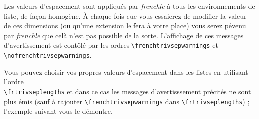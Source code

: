 \documentclass[a4paper,12pt,openright]{article}
\begin{document}
Les valeurs d’espacement sont appliqués par \textit{frenchle} à tous les environnements
de liste, de façon homogène. À chaque fois que vous essaierez de modifier
la valeur de ces dimensions (ou qu’une extension le fera à votre place) vous serez
pévenu par \textit{frenchle} que celà n’est pas possible de la sorte. L’affichage de ces
messages d’avertissement est contôlé par les ordres 
\verb|\frenchtrivsepwarnings| 
et \verb|\nofrenchtrivsepwarnings|.

Vous pouvez choisir vos propres valeurs d’espacement dans les listes en
utilisant l’ordre \\\verb|\frtrivseplengths| et dans ce cas les messages d’avertisssement
précités ne sont plus émis (sauf à 
rajouter \verb|\frenchtrivsepwarnings|
dans \verb|\frtrivseplengths|)
 ; l’exemple suivant vous le démontre.
\end{document}
